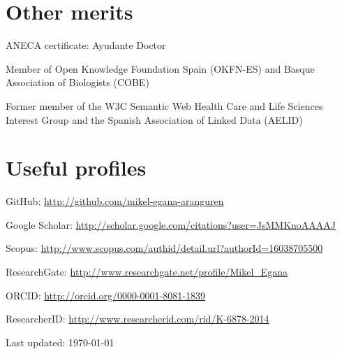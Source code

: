 \documentclass[11pt,fullpage]{article}
\renewenvironment{itemize}{
  \begin{list}{}{
    \setlength{\leftmargin}{1.5em}
  }
}{
  \end{list}
}
\begin{document}
\section*{Other merits}
\begin{itemize}
	\item ANECA certificate: Ayudante Doctor
	\item Member of Open Knowledge Foundation Spain (OKFN-ES) and Basque Association of Biologists (COBE)
	\item Former member of the W3C Semantic Web Health Care and Life Sciences Interest Group and the Spanish Association of Linked Data (AELID)
\end{itemize}

\section*{Useful profiles}
\begin{itemize}
	\item GitHub: \href{http://github.com/mikel-egana-aranguren}{http://github.com/mikel-egana-aranguren}
	\item Google Scholar: \href{http://scholar.google.com/citations?user=JsMMKnoAAAAJ}{http://scholar.google.com/citations?user=JsMMKnoAAAAJ}
	\item Scopus: \href{http://www.scopus.com/authid/detail.url?authorId=16038705500}{http://www.scopus.com/authid/detail.url?authorId=16038705500}
	\item ResearchGate: \href{http://www.researchgate.net/profile/Mikel_Egana}{http://www.researchgate.net/profile/Mikel\_Egana}
	\item ORCID: \href{http://orcid.org/0000-0001-8081-1839}{http://orcid.org/0000-0001-8081-1839}
	\item ResearcherID: \href{http://www.researcherid.com/rid/K-6878-2014}{http://www.researcherid.com/rid/K-6878-2014}
\end{itemize}






\bigskip
\begin{center}
  \begin{footnotesize}
    Last updated: \today
  \end{footnotesize}
\end{center}



\end{document}
